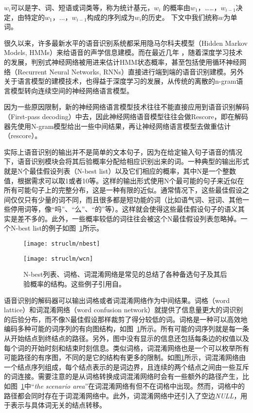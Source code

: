 $w_{i}$可以是字、词、短语或词类等，称为统计基元，$w_{i}$ 的概率由$w_1$，……，$w_{i-1}$决定，由特定的$w_1$，$...$，$w_{i-1}$构成的序列成为$w_i$的历史。
下文中我们统称$w$为单词。

很久以来，许多最新水平的语音识别系统都采用隐马尔科夫模型（Hidden Markov Models, HMMs）来给语音的声学信息建模\cite{gales2008application}。而在最近几年
，随着深度学习技术的发展，判别式神经网络被用进来估计HMM状态概率\cite{deng2013recent, hinton2012deep}，甚至包括使用循环神经网络（Recurrent Neural Networks, RNNs）直接进行端到端的语音识别建模\cite{graves2014towards}。另外关于语言模型的建模技术，也得益于深度学习的发展，从传统的离散的n-gram语言模型\cite{brown1992class}转向连续空间的神经网络语言模型\cite{mikolov2010recurrent}。

因为一些原因限制，新的神经网络语言模型技术往往不能直接应用到语音识别解码（First-pass decoding）中去，因此神经网络语音模型往往会做Rescore，即在解码器先使用N-gram模型给出一些中间结果，再让神经网络语言模型去做重估计（rescore）。

实际上语音识别的输出并不是简单的文本句子，因为在给定输入句子语音的情况下，语音识别模块会将其后验概率分配给相应识别出来的词。一种典型的输出形式就是N个最佳假设列表（N-best list）以及它们相应的概率，其中N是一个整数值，根据需求可以取1或者10等。这样的输出形式使用N个最可能的句子来近似在所有可能句子上的完整分布，这是一种有限的近似。通常情况下，这些最佳假设之间仅仅只有少量的词不同，而且很多都是短功能的词（比如语气词、冠词、其他一些停用词等，像“吗”、“么”、“的”等）。这样就会使得这些最佳假设句子的语义其实是差不多的。此外，一些概率较低的词往往会被这个N最佳假设列表忽略掉。一个N-best list的例子如图~\ref{fig:asr-output}所示。

\begin{figure}[htbp!]
\centering
\texttt{[image: struclm/nbest]}
\end{figure}
\begin{figure}[htbp!]
\centering
\texttt{[image: struclm/wcn]}
\caption{N-best列表、词格、词混淆网络是常见的总结了各种备选句子及其后验概率的结构。这些例子引用自\cite{jurafsky2014speech}。}
\label{fig:asr-output}
\end{figure}

语音识别的解码器可以输出词格或者词混淆网络作为中间结果。词格（word lattice）和词混淆网络（word confusion network）就提供了信息量更大的词识别的后验分布，而不像N最佳假设那样裁剪了得分较低的词。词格是一种可以高效地编码多种可能的词序列的有向图结构\cite{murveit1993large}，如图~\ref{fig:asr-output}所示。所有可能的词序列就是每一条从开始结点到终结点的路径。另外，图中没有显示的信息还包括每条边的权值以及每个词的开始时刻和结束时刻信息。类似词格，词混淆网络也是一个可以枚举所有可能路径的有序图，不同的是它的结构有更多的限制。如图\ref{fig:asr-output}所示，词混淆网络由一个结点序列组成，每个结点表示的是词边界，且连续的两个结点之间由一些互斥的词连接。需要注意的是从词格转换成词混淆网络时会有一些额外的路径产生，比如图~\ref{fig:asr-output}中“\emph{the scenario area}”在词混淆网络有但不在词格中出现。然而，词格中的路径都会同时存在于词混淆网络中。此外，词混淆网络中还引入了空边\emph{NULL}，用于表示与具体词无关的结点转移。

